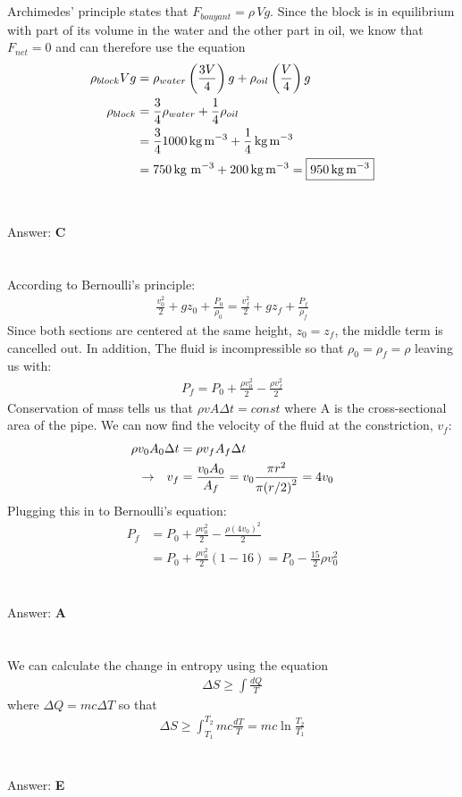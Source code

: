 \documentclass[12pt]{article}
\newcommand{\Answer}[1]{Answer: \textbf{#1}}
\newcommand{\Problem}[3]{
    \setcounter{section}{#1}
    \addtocounter{section}{-1}
    \section{}
    #3\\\\
    \Answer{#2}
}
\begin{document}
\Problem{31}{C}{%
Archimedes' principle states that $F_{bouyant} = \rho\, V g$. Since the block is in equilibrium with part of its volume in the water and the other part in oil, we know that $F_{net}= 0$ and can therefore use the equation
\begin{align}
\rho_{block} V g &= \rho_{water} \left(\frac{3V}{4}\right) g + \rho_{oil} \left(\frac{V}{4}\right) g\nonumber\\
\rho_{block} &=  \frac{3}{4}\rho_{water} +\frac{1}{4}  \rho_{oil} \nonumber\\
&= \frac{3}{4} 1000\,\text{kg\,m$^{-3}$}+ \frac{1}{4}\,\text{kg\,m$^{-3}$}\nonumber\\
&= 750\,\text{kg m$^{-3}$}+200\,\text{kg\,m$^{-3}$} = \boxed{950\,\text{kg\,m$^{-3}$}}\nonumber
\end{align}
}

\Problem{32}{A}{%
According to Bernoulli's principle:
\begin{align}
\frac{v_{0}^{2}}{2} + g z_{0}+ \frac{P_{0}}{\rho_{0}} = \frac{v_{f}^{2}}{2} + g z_{f} + \frac{P_{f}}{\rho_{f}}
\end{align}
Since both sections are centered at the same height, $z_{0} = z_{f}$, the middle term is cancelled out. In addition, The fluid is incompressible so that $\rho_{0} = \rho_{f} = \rho$ leaving us with:
\begin{align}
P_{f} = P_{0} + \frac{\rho v_{0}^{2}}{2}  - \frac{\rho v_{f}^{2}}{2}\nonumber
\end{align}
Conservation of mass tells us that $\rho v A \Delta t = const$ where A is the cross-sectional area of the pipe. We can now find the velocity of the fluid at the constriction, $v_{f}$:
\begin{align}
\rho v_{0} A_{0} \Delta t &= \rho v_{f} A_{f} \Delta t \nonumber\\
\rightarrow \hspace{.1in} v_{f} &= \frac{v_{0}A_{0}}{A_{f}} = v_{0} \frac{\pi r^2}{\pi {(r/2)}^2}= 4v_{0}\nonumber
\end{align}
Plugging this in to Bernoulli's equation:
\begin{align}
P_{f} &= P_{0} + \frac{\rho v_{0}^{2}}{2}  - \frac{\rho {(4v_{0})}^{2}}{2}\nonumber\\
&= P_{0} +\frac{\rho v_{0}^{2}}{2}\left(1-16\right)= \boxed{P_{0} -\frac{15}{2}\rho v_{0}^{2}}\nonumber
\end{align}
}

\Problem{33}{E}{%
We can calculate the change in entropy using the equation
\begin{align}
\Delta S \geq \int \frac{d Q}{T}
\end{align}
where $\Delta Q = mc \Delta T$ so that
\begin{align}
\Delta S \geq \int_{T_{1}}^{T_{2}} mc\frac{dT}{T} = \boxed{mc \ln{\frac{T_{2}}{T_{1}}}}\nonumber
\end{align}
}
\end{document}
